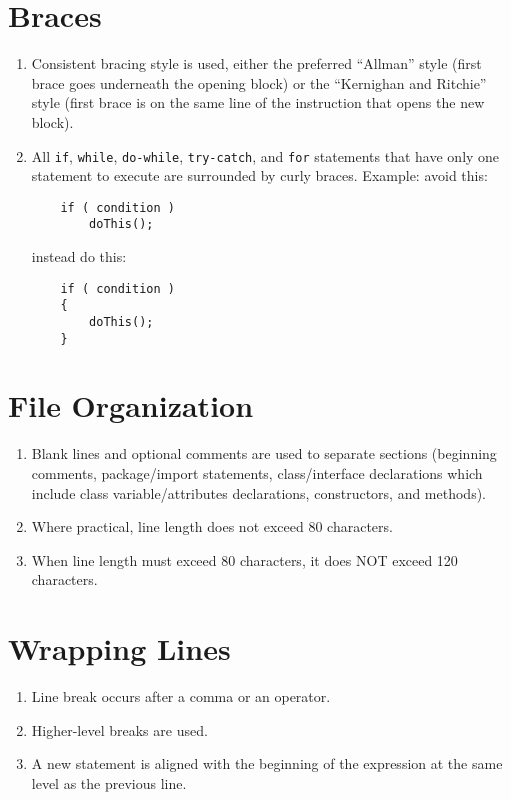 \section*{Braces}\begin{enumerate}[resume]
\item Consistent bracing style is used, either the preferred ``Allman'' style (first brace goes underneath the opening block) or the ``Kernighan and Ritchie'' style (first brace is on the same line of the instruction that opens the new block).
\item All \texttt{if}, \texttt{while}, \texttt{do-while}, \texttt{try-catch}, and \texttt{for} statements that have only one statement to execute are surrounded by curly braces. Example:
avoid this:


\begin{verbatim}
    if ( condition )
        doThis();
\end{verbatim}

instead do this:

\begin{verbatim}
    if ( condition ) 
    {
        doThis(); 
    }
\end{verbatim}

\end{enumerate}

\section*{File Organization}\begin{enumerate}[resume]
\item Blank lines and optional comments are used to separate sections (beginning comments, package/import statements, class/interface declarations which include class variable/attributes declarations, constructors, and methods).
\item Where practical, line length does not exceed 80 characters.
\item When line length must exceed 80 characters, it does NOT exceed 120 characters.
\end{enumerate}

\section*{Wrapping Lines}\begin{enumerate}[resume]
\item Line break occurs after a comma or an operator.
\item Higher-level breaks are used.
\item A new statement is aligned with the beginning of the expression at the same level as the previous line.
\end{enumerate}

